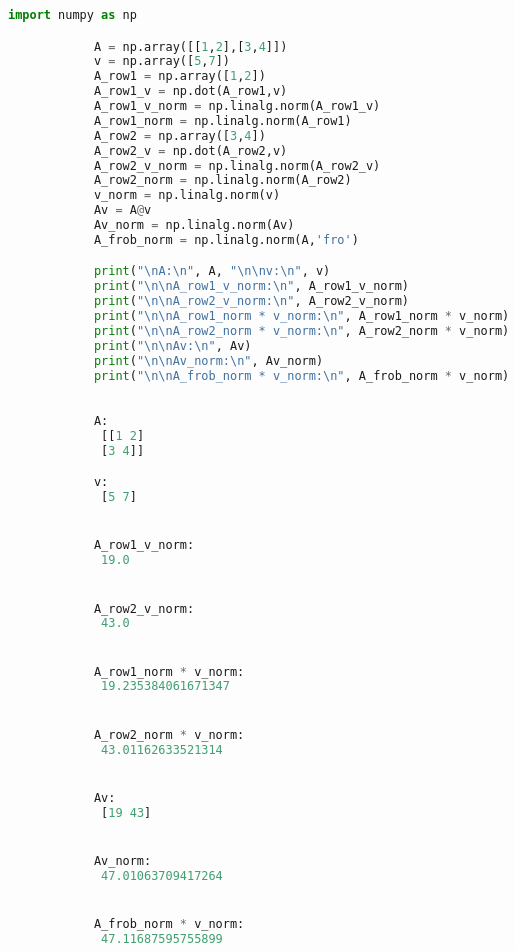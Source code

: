 \begin{example}
    \begin{tcolorbox}[sharp corners, colback=black!5!white, colframe=black!75!black, fontupper=\color{black}]
        \begin{lstlisting}[language=python, gobble = 12]
            import numpy as np

            A = np.array([[1,2],[3,4]])
            v = np.array([5,7])
            A_row1 = np.array([1,2])
            A_row1_v = np.dot(A_row1,v)
            A_row1_v_norm = np.linalg.norm(A_row1_v)
            A_row1_norm = np.linalg.norm(A_row1)
            A_row2 = np.array([3,4])
            A_row2_v = np.dot(A_row2,v)
            A_row2_v_norm = np.linalg.norm(A_row2_v)
            A_row2_norm = np.linalg.norm(A_row2)
            v_norm = np.linalg.norm(v)
            Av = A@v
            Av_norm = np.linalg.norm(Av)
            A_frob_norm = np.linalg.norm(A,'fro')

            print("\nA:\n", A, "\n\nv:\n", v)
            print("\n\nA_row1_v_norm:\n", A_row1_v_norm)
            print("\n\nA_row2_v_norm:\n", A_row2_v_norm)
            print("\n\nA_row1_norm * v_norm:\n", A_row1_norm * v_norm)
            print("\n\nA_row2_norm * v_norm:\n", A_row2_norm * v_norm)
            print("\n\nAv:\n", Av)
            print("\n\nAv_norm:\n", Av_norm)
            print("\n\nA_frob_norm * v_norm:\n", A_frob_norm * v_norm)
        \end{lstlisting}
    \end{tcolorbox}

    \begin{tcolorbox}[sharp corners, colback=green!10!white, colframe=black!75!black, fontupper=\color{black}]
        \begin{lstlisting}[language=python, gobble = 12]

            A:
             [[1 2]
             [3 4]] 

            v:
             [5 7]


            A_row1_v_norm:
             19.0


            A_row2_v_norm:
             43.0


            A_row1_norm * v_norm:
             19.235384061671347


            A_row2_norm * v_norm:
             43.01162633521314


            Av:
             [19 43]


            Av_norm:
             47.01063709417264


            A_frob_norm * v_norm:
             47.11687595755899
        \end{lstlisting}
    \end{tcolorbox}
\end{example}

